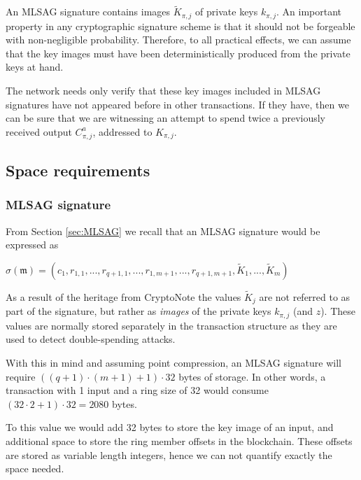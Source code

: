 An MLSAG signature contains images \(\tilde{K}_{\pi, j}\) of private keys \(k_{\pi, j}\). An important property in any cryptographic signature scheme is that it should not be forgeable with non-negligible probability. Therefore, to all practical effects, we can assume that the key images must have been deterministically produced from the private keys at hand.
	
The network needs only verify that these key images included in MLSAG signatures have not appeared before in other transactions. If they have, then we can be sure that we are witnessing an attempt to spend 
twice a previously received output \(C^a_{\pi, j}\), addressed to \(K_{\pi, j}\).





\subsection{Space requirements}

\subsubsection*{MLSAG signature}

From Section \ref{sec:MLSAG} we recall that an MLSAG signature would be expressed as

\(\sigma(\mathfrak{m}) = (c_1, r_{1, 1}, ..., r_{q+1, 1}, ..., r_{1, m+1}, ..., r_{q+1, m+1}, \tilde{K}_1, ...,  \tilde{K}_m) \)

As a result of the heritage from CryptoNote the values \(\tilde{K}_j\) are not referred to as part of
the signature, but rather as {\em images} of the private keys \(k_{\pi,j}\) (and \(z\)).
These values are normally stored separately in the transaction structure as they are used to detect 
double-spending attacks.

With this in mind and assuming point compression, an MLSAG signature will require \(((q+1) \cdot (m+1) + 1) \cdot 32  \)
bytes of storage.
In other words, a transaction with 1 input and a ring size of 32 would consume \( (32 \cdot 2 + 1 ) \cdot 32 = 2080\) bytes.

To this value we would add 32 bytes to store the key image of an input, and  additional space to store the
ring member offsets in the blockchain. These offsets are stored as variable length integers, hence we can not
quantify exactly the space needed.
\\



